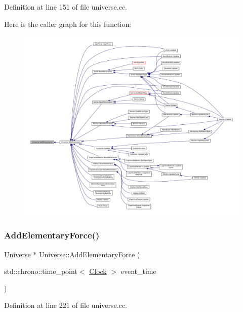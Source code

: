 Definition at line 151 of file universe.\+cc.

Here is the caller graph for this function\+:\nopagebreak
\begin{figure}[H]
\begin{center}
\leavevmode
\includegraphics[width=350pt]{class_universe_a03bdf5f7fea4209241e9bf5316d45517_icgraph}
\end{center}
\end{figure}
\mbox{\label{class_universe_a90c573dec55f2b3ad5680015356f5f25}} 
\subsubsection{\texorpdfstring{Add\+Elementary\+Force()}{AddElementaryForce()}}
{\footnotesize\ttfamily \mbox{\hyperlink{class_universe}{Universe}} $\ast$ Universe\+::\+Add\+Elementary\+Force (\begin{DoxyParamCaption}\item[{std\+::chrono\+::time\+\_\+point$<$ \mbox{\hyperlink{universe_8h_a0ef8d951d1ca5ab3cfaf7ab4c7a6fd80}{Clock}} $>$}]{event\+\_\+time }\end{DoxyParamCaption})}



Definition at line 221 of file universe.\+cc.

